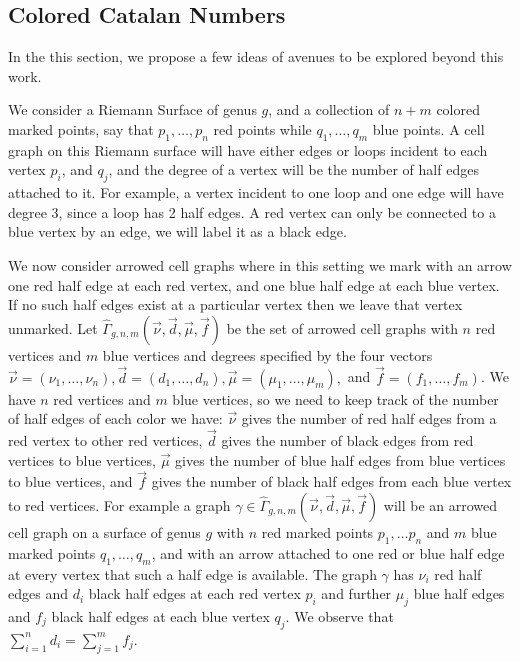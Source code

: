 \documentclass{amsart}
\theoremstyle{definition}
\begin{document}
\subsection{Colored Catalan Numbers} 

In the this section, we propose a few ideas of avenues to be explored beyond this work.


We consider a Riemann Surface of genus $g$, and a collection of $n+m$ colored marked points, say that $p_1,\ldots, p_n$ red points while $q_1,\ldots, q_m$ blue points. A cell graph on this Riemann surface will have either edges or loops incident to each vertex $p_i$, and $q_j$, and the degree of a vertex will be the number of half edges attached to it. For example, a vertex incident to one loop and one edge will have degree 3, since a loop has 2 half edges. A red vertex can only be connected to a blue vertex by an edge, we will label it as a black edge.




We now consider arrowed cell graphs where in this setting we mark with an arrow one red half edge at each red vertex, and one blue half edge at each blue vertex. If no such half edges exist at a particular vertex then we leave that vertex unmarked. Let $\widehat{\Gamma}_{g,n,m}(\overrightarrow{\nu},\overrightarrow{d},\overrightarrow{\mu},\overrightarrow{f})$ be the set of arrowed cell graphs with $n$ red vertices and $m$ blue vertices and degrees specified by the four vectors $\overrightarrow{\nu}=(\nu_1,\ldots,\nu_n), \overrightarrow{d}=(d_1,\ldots,d_n), \overrightarrow{\mu}=(\mu_1,\ldots,\mu_m),$ and $ \overrightarrow{f}=(f_1,\ldots,f_m)$. We have $n$ red vertices and $m$ blue vertices, so we need to keep track of the number of half edges of each color we have: $\vec\nu$ gives the number of red half edges from a red vertex to other red vertices, $\vec{d}$ gives the number of black edges from red vertices to blue vertices, $\vec{\mu}$ gives the number of blue half edges from blue vertices to blue vertices, and $\vec{f}$ gives the number of black half edges from each blue vertex to red vertices. For example a graph $\gamma\in \widehat{\Gamma}_{g,n,m}(\overrightarrow{\nu},\overrightarrow{d},\overrightarrow{\mu},\overrightarrow{f})$ will be an arrowed cell graph on a surface of genus $g$ with $n$ red marked points $p_1,\ldots p_n$ and $m$ blue marked points $q_1,\ldots, q_m$, and with an arrow attached to one red or blue half edge at every vertex that such a half edge is available.
The graph $\gamma$ has $\nu_i$ red half edges and $d_i$ black half edges at each red vertex $p_i$ and further $\mu_j$ blue half edges and $f_j$ black half edges at each blue vertex $q_j$. We observe that $\sum_{i=1}^n d_i=\sum_{j=1}^m f_j$.
\end{document}
